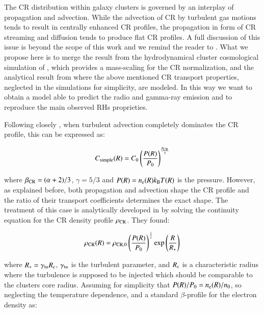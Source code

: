 \documentclass[traditabstract]{aa}
\newcommand{\rmn}{\mathrm}
\begin{document}
The CR distribution within galaxy clusters is governed by an interplay of propagation and advection. While the advection of CR by turbulent gas motions tends to result in centrally enhanced CR profiles, the propagation in form of CR streaming and diffusion tends to produce flat CR profiles. A full discussion of this issue is beyond the scope of this work and we remind the reader to \cite{2011A&A...527A..99E}. What we propose here is to merge the result from the hydrodynamical cluster cosmological simulation of \cite{2010MNRAS.409..449P}, which provides a mass-scaling for the CR normalization, and the analytical result from \cite{2011A&A...527A..99E} where the above mentioned CR transport properties, neglected in the \cite{2010MNRAS.409..449P} simulations for simplicity, are modeled. In this way we want to obtain a model able to predict the radio and gamma-ray emission and to reproduce the main observed RHs proprieties.

Following closely \cite{2011A&A...527A..99E}, when turbulent advection completely dominates the CR profile, this can be expressed as:

\begin{equation}
C_{\rm{simple}}(R) = C_{0} \left( \frac{P(R)}{P_{0}} \right)^{\frac{\beta_{\rm{CR}}}{\gamma}}
\label{eq:Csimple}
\end{equation} 

where $\beta_{\rm{CR}}=(\alpha+2)/3$, $\gamma=5/3$ and $P(R)=n_{\rm{e}}(R) k_{\rm{B}} T(R)$ is the pressure. However, as explained before, both propagation and advection shape the CR profile and the ratio of their transport coefficients determines the exact shape. The treatment of this case is analytically developed in \cite{2011A&A...527A..99E} by solving the continuity equation for the CR density profile $\rho_{\rm{CR}}$. They found:

\begin{equation}
\rho_{\rm{CR}}(R) = \rho_{\rm{CR},0} \left( \frac{P(R)}{P_{0}} \right)^{\frac{1}{\gamma}} \rmn{exp} \left( \frac{R}{R_{*}} \right)
\label{eg:rhoCR}
\end{equation} 

where $R_{*}=\gamma_{\rm{\rm{tu}}}R_{\rm{c}}$, $\gamma_{\rm{tu}}$ is the turbulent parameter, and $R_{\rm{c}}$ is a characteristic radius where the turbulence is supposed to be injected which should be comparable to the clusters core radius. Assuming for simplicity that $P(R)/P_{0}=n_{\rm{e}}(R)/n_{0}$, so neglecting the temperature dependence, and a standard $\beta$-profile for the electron density as:
\end{document}
